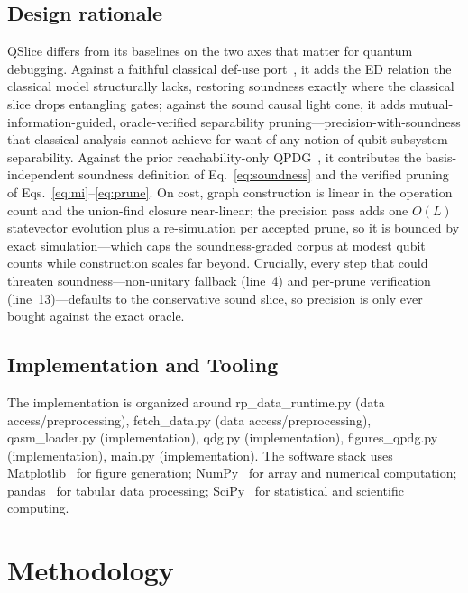 \documentclass[10pt,conference]{IEEEtran}
\theoremstyle{definition}
\begin{document}
\subsection{Design rationale}
QSlice differs from its baselines on the two axes that matter for quantum debugging. Against a faithful classical def-use port~\cite{ferrante1987pdg, horwitz1990interprocedural}, it adds the ED relation the classical model structurally lacks, restoring soundness exactly where the classical slice drops entangling gates; against the sound causal light cone, it adds mutual-information-guided, oracle-verified separability pruning---precision-with-soundness that classical analysis cannot achieve for want of any notion of qubit-subsystem separability. Against the prior reachability-only QPDG~\cite{yu2025qpdg}, it contributes the basis-independent soundness definition of Eq.~\eqref{eq:soundness} and the verified pruning of Eqs.~\eqref{eq:mi}--\eqref{eq:prune}. On cost, graph construction is linear in the operation count and the union-find closure near-linear; the precision pass adds one $O(L)$ statevector evolution plus a re-simulation per accepted prune, so it is bounded by exact simulation---which caps the soundness-graded corpus at modest qubit counts while construction scales far beyond. Crucially, every step that could threaten soundness---non-unitary fallback (line~4) and per-prune verification (line~13)---defaults to the conservative sound slice, so precision is only ever bought against the exact oracle.



\subsection{Implementation and Tooling}
The implementation is organized around rp\_data\_runtime.py (data access/preprocessing), fetch\_data.py (data access/preprocessing), qasm\_loader.py (implementation), qdg.py (implementation), figures\_qpdg.py (implementation), main.py (implementation).
The software stack uses Matplotlib~\cite{hunter2007matplotlib} for figure generation; NumPy~\cite{harris2020array} for array and numerical computation; pandas~\cite{mckinney2010data} for tabular data processing; SciPy~\cite{virtanen2020scipy} for statistical and scientific computing.

\section{Methodology}
\label{sec:methodology}
\end{document}
